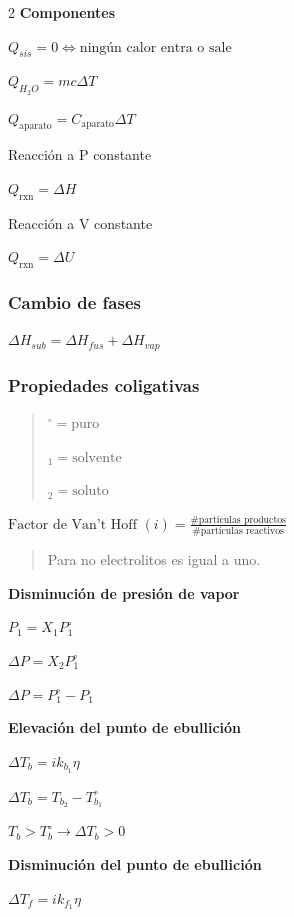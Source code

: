 \begin {multicols}{2}
\textbf{Componentes}

\(Q_{sis}=0\Leftrightarrow\text{ningún calor entra o sale}\)

\(Q_{H_{2}O}=mc{\Delta}T\)

\(Q_{\text{aparato}}=C_{\text{aparato}}{\Delta}T\)

Reacción a P constante

\(Q_{\text{rxn}}={\Delta}H\)

Reacción a V constante

\(Q_{\text{rxn}}={\Delta}U\)

\hypertarget{cambio-de-fases}{%
\subsubsection{Cambio de fases}\label{cambio-de-fases}}

\({\Delta}H_{sub}={\Delta}H_{fus}+{\Delta}H_{vap}\)

\hypertarget{propiedades-coligativas}{%
\subsubsection{Propiedades coligativas}\label{propiedades-coligativas}}

\begin{quote}
\(^\circ=\text{puro}\)

\(_1=\text{solvente}\)

\(_2=\text{soluto}\)
\end{quote}

\(\text{Factor de Van't Hoff }(i)=\frac{\text{\# partículas productos}}{\text{\# partículas reactivos}}\)

\begin{quote}
Para no electrolitos es igual a uno.
\end{quote}

\textbf{Disminución de presión de vapor}

\(P_1=X_1P_1^\circ\)

\({\Delta}P=X_2P_1^\circ\)

\({\Delta}P=P_1^\circ-P_1\)

\textbf{Elevación del punto de ebullición}

\({\Delta}T_b=ik_{b_1}\eta\)

\({\Delta}T_b=T_{b_2}-T_{b_1}^\circ\)

\(T_b>T_b^\circ→{\Delta}T_b>0\)

\textbf{Disminución del punto de ebullición}

\({\Delta}T_f=ik_{f_1}\eta\)


\end{multicols}
